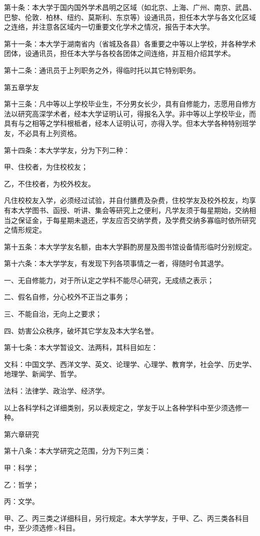 第十条：本大学于国内国外学术昌明之区域（如北京、上海、广州、南京、武昌、巴黎、伦敦．柏林、纽约、莫斯利、东京等）设通讯员，担任本大学与各文化区域之连络，并注意各区域内一切重要文化学术之情况，报告于本大学。

第十一条：本大学于湖南省内（省城及各县）各重要之中等以上学校，并各种学术团体，设通讯员，担任本大学与各校各团体之间连络，并互相介绍其学术。

第十二条：通讯员于上列职务之外，得临时托以其它特别职务。

第五章学友

第十三条：凡中等以上学校毕业生，不分男女长少，具有自修能力，志愿用自修方法以研究高深学术者，经本大学证明认可，得报名入学。非中等以上学校毕业，而具有与之相等之学科根柢者，经本人证明认可，亦得入学。但本大学各种特别班学友，不必具有上列资格。

第十四条：本大学学友，分为下列二种：

甲、住校者，为住校校友；

乙，不住校者，为校外校友。

凡住校校友入学，必须经过试验，并自付膳费及杂费，住校学友及校外校友，均享有本大学图书、函授、听讲、集会等研究上之便利，凡学友须于每星期始，交纳相当之保证金，于每星期未退还，学友应否交纳学费，及学费交纳多寡临时依所研究之情形规定。

第十五条：本大学学友名额，由本大学斟酌房屋及图书馆设备情形临时分别规定。

第十六条：本大学学友，有发现下列各项事情之一者，得随时令其退学。

一、无自修能力，对于所认定之学科不能尽心研究，无成绩之表示；

二、假名自修，分心校外不正当之事务；

三、不能自治，无向上之要求；

四、妨害公众秩序，破坏其它学友及本大学名誉。

第十七条：本大学暂设文、法两科，其科目如左：

文科：中国文学、西洋文学、英文、论理学、心理学、教育学，社会学、历史学、地理学、新闻学、哲学。

法科：法律学、政治学、经济学。

以上各科学科之详细类别，另以表规定之，学友于以上各种学科中至少须选修一种。

第六章研究

第十八条：本大学研究之范围，分为下列三类：

甲：科学；

乙：哲学；

丙：文学。

甲、乙、丙三类之详细科目，另行规定。本大学学友，于甲、乙、丙三类各科目中，至少须选修×科目。

